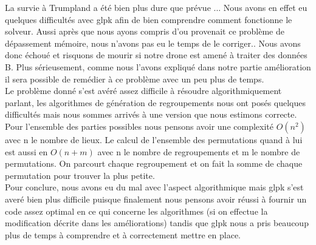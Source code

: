 \documentclass[a4paper,sffamily,12pt]{article}
\begin{document}
		La survie à Trumpland a été bien plus dure que prévue ... Nous avons en effet eu quelques difficultés avec glpk afin de bien comprendre comment fonctionne le solveur. Aussi après que nous ayons compris d'ou provenait ce problème de dépassement mémoire,  nous n'avons pas eu le temps de le corriger.. Nous avons donc échoué et risquons de mourir si notre drone est amené à traiter des données B. Plus sérieusement, comme nous l'avons expliqué dans notre partie amélioration il sera possible de remédier à ce problème avec un peu plus de temps.\\
		\indent Le problème donné s'est avéré assez difficile à résoudre algorithmiquement parlant, les algorithmes de génération de regroupements nous ont posés quelques difficultés mais nous sommes arrivés à une version que nous estimons correcte. Pour l'ensemble des parties possibles nous pensons avoir une complexité $O(n^{2})$ avec n le nombre de lieux. Le calcul de l'ensemble des permutations quand à lui est aussi en $O(n+m)$ avec n le nombre de regroupements et m le nombre de permutations. On parcourt chaque regroupement et on fait la somme de chaque permutation pour trouver la plus petite.\\
		\indent Pour conclure, nous avons eu du mal avec l'aspect algorithmique mais glpk s'est averé bien plus difficile puisque finalement nous pensons avoir réussi à fournir un code assez optimal en ce qui concerne les algorithmes (si on effectue la modification décrite dans les améliorations) tandis que glpk nous a pris beaucoup plus de temps à comprendre et à correctement mettre en place.

										
\end{document}

